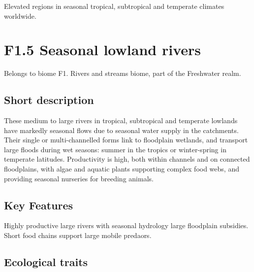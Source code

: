 \documentclass[
  letterpaper,
  DIV=11,
  numbers=noendperiod]{scrartcl}
\begin{document}
Elevated regions in seasonal tropical, subtropical and temperate
climates worldwide.

\section{F1.5 Seasonal lowland
rivers}\label{f1.5-seasonal-lowland-rivers-1}

Belongs to biome F1. Rivers and streams biome, part of the Freshwater
realm.

\subsection{Short description}\label{short-description-113}

These medium to large rivers in tropical, subtropical and temperate
lowlands have markedly seasonal flows due to seasonal water supply in
the catchments. Their single or multi-channelled forms link to
floodplain wetlands, and transport large floods during wet seasons:
summer in the tropics or winter-spring in temperate latitudes.
Productivity is high, both within channels and on connected floodplains,
with algae and aquatic plants supporting complex food webs, and
providing seasonal nurseries for breeding animals.

\subsection{Key Features}\label{key-features-113}

Highly productive large rivers with seasonal hydrology large floodplain
subsidies. Short food chains support large mobile predaors.

\subsection{Ecological traits}\label{ecological-traits-113}
\end{document}
